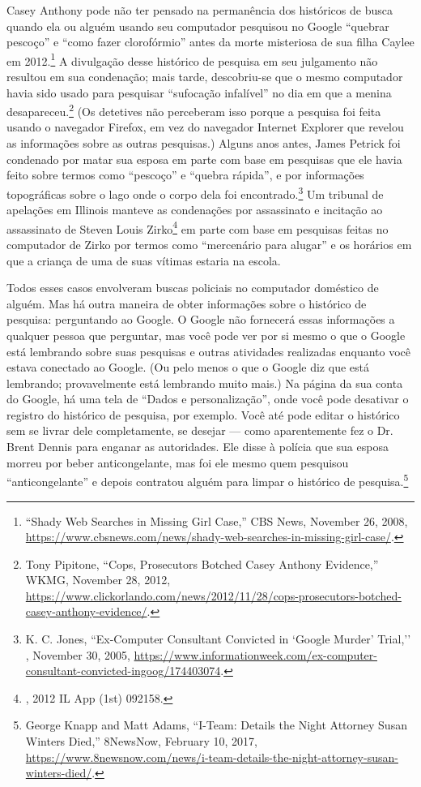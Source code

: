 Casey Anthony pode não ter pensado na permanência dos históricos de busca quando ela ou alguém 
usando seu computador pesquisou no Google ``quebrar pescoço'' e ``como fazer clorofórmio'' antes
da morte misteriosa de sua filha Caylee em 2012.\footnote{``Shady Web Searches in Missing Girl
Case,'' CBS News, November 26, 2008, \url{https://www.cbsnews.com/news/shady-web-searches-in-missing-girl-case/}.}
A divulgação desse histórico de pesquisa em seu julgamento não resultou em sua condenação; mais
tarde, descobriu-se que o mesmo computador havia sido usado para pesquisar ``sufocação infalível''
no dia em que a menina desapareceu.\footnote{Tony Pipitone, ``Cops, Prosecutors Botched Casey
Anthony Evidence,'' WKMG, November 28, 2012,
\url{https://www.clickorlando.com/news/2012/11/28/cops-prosecutors-botched-casey-anthony-evidence/}.}
(Os detetives não perceberam isso porque a pesquisa foi feita usando o navegador Firefox, em vez do
navegador Internet Explorer que revelou as informações sobre as outras pesquisas.) Alguns anos
antes, James Petrick foi condenado por matar sua esposa em parte com base em pesquisas que ele
havia feito sobre termos como ``pescoço'' e ``quebra rápida'', e por informações topográficas sobre
o lago onde o corpo dela foi encontrado.\footnote{K. C. Jones, ``Ex-Computer Consultant Convicted
in `Google Murder’ Trial,'' , November 30, 2005,
\url{https://www.informationweek.com/ex-computer-consultant-convicted-ingoog/174403074}.} Um tribunal
de apelações em Illinois manteve as condenações por assassinato e incitação ao assassinato de Steven
Louis Zirko\footnote{, 2012 IL App (1st) 092158.} em parte com base em
pesquisas feitas no computador de Zirko por termos como ``mercenário para alugar'' e os horários em
que a criança de uma de suas vítimas estaria na escola.

Todos esses casos envolveram buscas policiais no computador doméstico de alguém. Mas há outra
maneira de obter informações sobre o histórico de pesquisa: perguntando ao Google. O Google não
fornecerá essas informações a qualquer pessoa que perguntar, mas você pode ver por si mesmo o que o
Google está lembrando sobre suas pesquisas e outras atividades realizadas enquanto você estava
conectado ao Google. (Ou pelo menos o que o Google diz que está lembrando; provavelmente está
lembrando muito mais.) Na página da sua conta do Google, há uma tela de ``Dados e personalização'',
onde você pode desativar o registro do histórico de pesquisa, por exemplo. Você até pode editar o
histórico sem se livrar dele completamente, se desejar --- como aparentemente fez o Dr. Brent
Dennis para enganar as autoridades. Ele disse à polícia que sua esposa morreu por beber
anticongelante, mas foi ele mesmo quem pesquisou ``anticongelante'' e depois contratou alguém
para limpar o histórico de pesquisa.\footnote{George Knapp and Matt Adams, ``I-Team: Details the
Night Attorney Susan Winters Died,'' 8NewsNow, February 10, 2017,
\url{https://www.8newsnow.com/news/i-team-details-the-night-attorney-susan-winters-died/}.}

